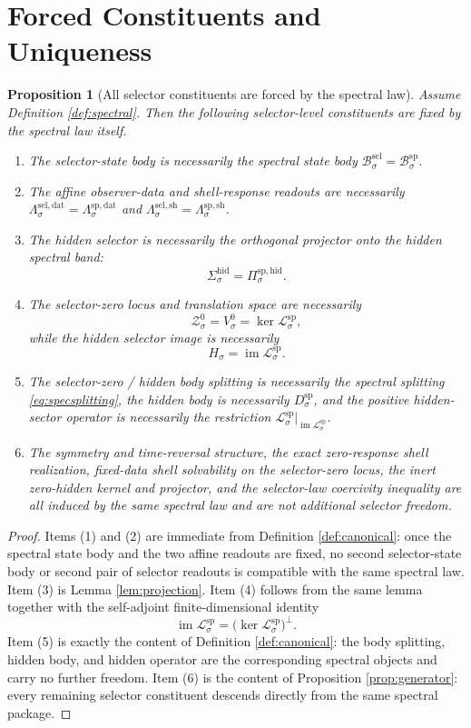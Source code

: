 \documentclass[11pt]{article}
\newcommand{\GapSpace}[1]{H_{#1}}
\newcommand{\GenBody}[1]{\mathcal B_{#1}^{\mathrm{sel}}}
\newcommand{\GenData}[1]{\Lambda_{#1}^{\mathrm{sel,dat}}}
\newcommand{\GenShell}[1]{\Lambda_{#1}^{\mathrm{sel,sh}}}
\newcommand{\HiddenSel}[1]{\Sigma_{#1}^{\mathrm{hid}}}
\newcommand{\ZeroHiddenSlice}[1]{\mathcal Z_{#1}^{0}}
\newcommand{\ZeroHiddenVec}[1]{V_{#1}^{0}}
\newcommand{\SpecBody}[1]{\mathcal B_{#1}^{\mathrm{sp}}}
\newcommand{\SpecData}[1]{\Lambda_{#1}^{\mathrm{sp,dat}}}
\newcommand{\SpecShell}[1]{\Lambda_{#1}^{\mathrm{sp,sh}}}
\newcommand{\SpecOp}[1]{\mathcal L_{#1}^{\mathrm{sp}}}
\newcommand{\SpecHiddenBody}[1]{D_{#1}^{\mathrm{sp}}}
\newcommand{\SpecProj}[1]{\Pi_{#1}^{\mathrm{sp,hid}}}
\newtheorem{proposition}{Proposition}
\begin{document}
\section{Forced Constituents and Uniqueness}

\begin{proposition}[All selector constituents are forced by the spectral law]
\label{prop:forced}
Assume Definition \ref{def:spectral}. Then the following selector-level constituents are fixed by the spectral law itself.
\begin{enumerate}
    \item The selector-state body is necessarily the spectral state body \(\GenBody{\sigma}=\SpecBody{\sigma}\).
    \item The affine observer-data and shell-response readouts are necessarily \(\GenData{\sigma}=\SpecData{\sigma}\) and \(\GenShell{\sigma}=\SpecShell{\sigma}\).
    \item The hidden selector is necessarily the orthogonal projector onto the hidden spectral band:
    \[
    \HiddenSel{\sigma}=\SpecProj{\sigma}.
    \]
    \item The selector-zero locus and translation space are necessarily
    \[
    \ZeroHiddenSlice{\sigma}=\ZeroHiddenVec{\sigma}=\ker\SpecOp{\sigma},
    \]
    while the hidden selector image is necessarily
    \[
    \GapSpace{\sigma}=\operatorname{im}\SpecOp{\sigma}.
    \]
    \item The selector-zero / hidden body splitting is necessarily the spectral splitting \eqref{eq:specsplitting}, the hidden body is necessarily \(\SpecHiddenBody{\sigma}\), and the positive hidden-sector operator is necessarily the restriction \(\SpecOp{\sigma}\big|_{\operatorname{im}\SpecOp{\sigma}}\).
    \item The symmetry and time-reversal structure, the exact zero-response shell realization, fixed-data shell solvability on the selector-zero locus, the inert zero-hidden kernel and projector, and the selector-law coercivity inequality are all induced by the same spectral law and are not additional selector freedom.
\end{enumerate}
\end{proposition}

\begin{proof}
Items (1) and (2) are immediate from Definition \ref{def:canonical}: once the spectral state body and the two affine readouts are fixed, no second selector-state body or second pair of selector readouts is compatible with the same spectral law. Item (3) is Lemma \ref{lem:projection}. Item (4) follows from the same lemma together with the self-adjoint finite-dimensional identity
\[
\operatorname{im}\SpecOp{\sigma}
=
\bigl(\ker\SpecOp{\sigma}\bigr)^{\perp}.
\]
Item (5) is exactly the content of Definition \ref{def:canonical}: the body splitting, hidden body, and hidden operator are the corresponding spectral objects and carry no further freedom. Item (6) is the content of Proposition \ref{prop:generator}: every remaining selector constituent descends directly from the same spectral package.
\end{proof}
\end{document}
